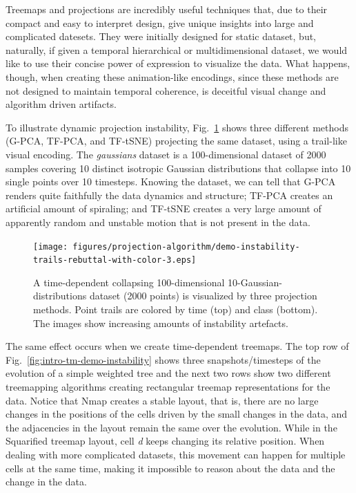 Treemaps and projections are incredibly useful techniques that, due to their compact and easy to interpret design, give unique insights into large and complicated datesets.
They were initially designed for static dataset, but, naturally, if given a temporal hierarchical or multidimensional dataset, we would like to use their concise power of expression to visualize the data. What happens, though, when creating these animation-like encodings, since these methods are not designed to maintain temporal coherence, is deceitful visual change and algorithm driven artifacts.

To illustrate dynamic projection instability, Fig.~\ref{fig:intro-pj-demo-instability} shows three different methods (G-PCA, TF-PCA, and TF-tSNE) projecting the same dataset, using a trail-like visual encoding. The \emph{gaussians} dataset is a 100-dimensional dataset of 2000 samples covering 10 distinct isotropic Gaussian distributions that collapse into 10 single points over 10 timesteps. Knowing the dataset, we can tell that G-PCA renders quite faithfully the data dynamics and structure; TF-PCA creates an artificial amount of spiraling; and TF-tSNE creates a very large amount of apparently random and unstable motion that is not present in the data.  


\begin{figure}[h]
    \centering
    \texttt{[image: figures/projection-algorithm/demo-instability-trails-rebuttal-with-color-3.eps]}
    \caption{A time-dependent collapsing 100-dimensional 10-Gaussian-distributions dataset (2000 points) is visualized by three projection methods. Point trails are colored by time (top) and class (bottom). The images show increasing amounts of instability artefacts.}
    \label{fig:intro-pj-demo-instability}
\end{figure}

The same effect occurs when we create time-dependent treemaps. The top row of Fig.~\ref{fig:intro-tm-demo-instability} shows three snapshots/timesteps of the evolution of a simple weighted tree and the next two rows show two different treemapping algorithms creating rectangular treemap representations for the data.
Notice that Nmap creates a stable layout, that is, there are no large changes in the positions of the cells driven by the small changes in the data, and the adjacencies in the layout remain the same over the evolution.
While in the Squarified treemap layout, cell \emph{d} keeps changing its relative position. When dealing with more complicated datasets, this movement can happen for multiple cells at the same time, making it impossible to reason about the data and the change in the data.

